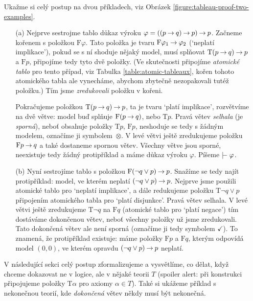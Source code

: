 \begin{example}\label{example:tableau-intro-examples}
Ukažme si celý postup na dvou příkladech, viz Obrázek \ref{figure:tableau-proof-two-examples}.
\begin{itemize}
    \item[(a)] Nejprve sestrojme tablo důkaz výroku $\varphi=((p\mathbin{\rightarrow} q)\mathbin{\rightarrow} p)\mathbin{\rightarrow} p$. Začneme kořenem s položkou $\mathrm{F}\varphi$. Tato položka je tvaru $\mathrm{F}\varphi_1\mathbin{\rightarrow}\varphi_2$ (`neplatí implikace'), pokud se s ní shoduje nějaký model, musí splňovat $\mathrm{T}(p\mathbin{\rightarrow} q)\mathbin{\rightarrow} p$ a $\mathrm{F}p$, připojíme tedy tyto dvě položky. (Ve skutečnosti připojíme \emph{atomické tablo} pro tento případ, viz Tabulka \ref{table:atomic-tableaux}, kořen tohoto atomického tabla ale vynecháme, abychom zbytečně nezopakovali tutéž položku.) Tím jsme \emph{zredukovali} položku v kořeni. 
    
    Pokračujeme položkou $\mathrm{T}(p\mathbin{\rightarrow} q)\mathbin{\rightarrow} p$, ta je tvaru `platí implikace', rozvětvíme na dvě větve: model buď splňuje $\mathrm{F}(p\mathbin{\rightarrow} q)$, nebo $\mathrm{T}p$. Pravá větev \emph{selhala} (je \emph{sporná}), neboť obsahuje položky $\mathrm{T}p$, $\mathrm{F}p$, neshoduje se tedy s žádným modelem, označíme ji symbolem~$\otimes$. V levé větvi ještě zredukujeme položku $\mathrm{F}p\mathbin{\rightarrow} q$ a také dostaneme spornou větev. Všechny větve jsou sporné, neexistuje tedy žádný protipříklad a máme důkaz výroku $\varphi$. Píšeme $\proves\varphi$.
    
    \item[(b)] Nyní sestrojíme tablo s položkou $\mathrm{F}(\neg q\lor p)\mathbin{\rightarrow} p$. Snažíme se tedy najít protipříklad: model, ve kterém neplatí $(\neg q\lor p)\mathbin{\rightarrow} p$. Nejprve jsme použili atomické tablo pro `neplatí implikace', a dále redukujeme položku $\mathrm{T}\neg q\lor p$ připojením atomického tabla pro `platí disjunkce'. Pravá větev selhala. V levé větvi ještě zredukujeme $\mathrm{T}\neg q$ na $\mathrm{F}q$ (atomické tablo pro `platí negace') tím dostáváme dokončenou větev, neboť všechny položky už jsme zredukovali. Tato dokončená větev ale není sporná (označíme ji tedy symbolem $\checkmark$). To znamená, že protipříklad existuje: máme položky $\mathrm{F}p$ a $\mathrm{F}q$, kterým odpovídá model $(0,0)$, ve kterém opravdu $(\neg q\lor p)\mathbin{\rightarrow} p$ neplatí.

\end{itemize}

V následující sekci celý postup zformalizujeme a vysvětlíme, co dělat, když chceme dokazovat ne v logice, ale v nějaké teorii $T$ (spoiler alert: při konstrukci připojujeme položky $\mathrm{T}\alpha$ pro axiomy $\alpha\in T$). Také si ukážeme příklad s nekonečnou teorií, kde \emph{dokončená} větev někdy musí být nekonečná.


\end{example}
